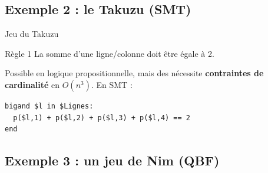 \documentclass[english,french,usenames,dvipsnames]{beamer}
\begin{document}
\subsection{Exemple 2 : le Takuzu (SMT)}

\begin{frame}{\subsecname}
Jeu du Takuzu
\end{frame}

\begin{frame}[containsverbatim]{\subsecname}
\begin{exampleblock}{Règle 1}
La somme d'une ligne/colonne doit être égale à 2.
\end{exampleblock}

Possible en logique propositionnelle, mais des nécessite \textbf{contraintes de cardinalité} en $O(n^3)$. En SMT :
\begin{verbatim}
bigand $l in $Lignes:
  p($l,1) + p($l,2) + p($l,3) + p($l,4) == 2
end
\end{verbatim}
\end{frame}


\subsection{Exemple 3 : un jeu de Nim (QBF)}
\end{document}
